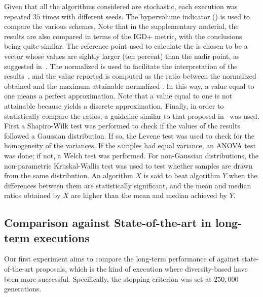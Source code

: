 Given that all the algorithms considered are stochastic, each execution was repeated $35$ times with different seeds.
%
The hypervolume indicator (\HV{}) is used to compare the various schemes.
%
Note that in the supplementary material, the results are also compared in terms of the IGD+ metric, with the conclusions being quite similar.
%
The reference point used to calculate the \HV{} is chosen to be a vector whose values are sightly larger (ten percent) than the nadir point, 
as suggested in~\cite{ishibuchi2017reference}.
%
The normalized \HV{} is used to facilitate the interpretation of the results~\cite{li2015evolutionary},
and the value reported is computed as the ratio between the normalized \HV{} obtained and the maximum attainable 
normalized \HV{}.
%
In this way, a value equal to one means a perfect approximation.
%
Note that a value equal to one is not attainable because \MOEAS{} yields a discrete approximation.
%
Finally, in order to statistically compare the \HV{} ratios, a guideline similar to that proposed in~\cite{Joel:StatisticalTest} was used. 
%
First a Shapiro-Wilk test was performed to check if the values of the results followed a Gaussian distribution. 
%
If so, the Levene test was used to check for the homogeneity of the variances. 
%
If the samples had equal variance, an ANOVA test was done; if not, a Welch test was performed. 
%
For non-Gaussian distributions, the non-parametric Kruskal-Wallis test was used to test whether samples are drawn from the same distribution. 
%
An algorithm $X$ is said to beat algorithm $Y$ when the differences between them are statistically significant, and the mean and median \HV{} ratios 
obtained by $X$ are higher than the mean and median achieved by $Y$.

%

\subsection{Comparison against State-of-the-art \MOEAS{} in long-term executions}

Our first experiment aims to compare the long-term performance of \VSDMOEA{} against state-of-the-art proposals, which
is the kind of execution where diversity-based \EAS{} have been more successful.
%
Specifically, the stopping criterion was set at $250,000$ generations.
%

